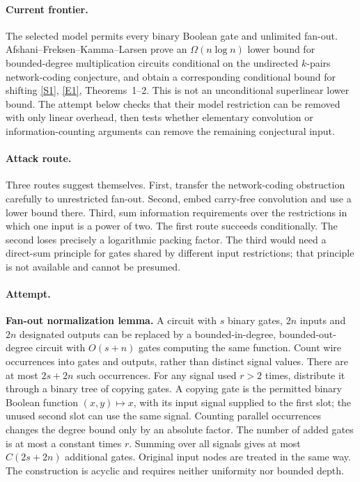 \documentclass[11pt,a4paper]{article}
\newcommand{\sref}[2]{\hyperlink{source:#1:#2}{[S#2]}}
\newcommand{\eref}[2]{\hyperlink{extra:#1:#2}{[E#2]}}
\numberwithin{equation}{section}
\begin{document}
\paragraph{Current frontier.}
The selected model permits every binary Boolean gate and unlimited fan-out. Afshani--Freksen--Kamma--Larsen prove an $\Omega(n\log n)$ lower bound for bounded-degree multiplication circuits conditional on the undirected $k$-pairs network-coding conjecture, and obtain a corresponding conditional bound for shifting \sref{189}{1}, \eref{189}{1}, Theorems~1--2. This is not an unconditional superlinear lower bound. The attempt below checks that their model restriction can be removed with only linear overhead, then tests whether elementary convolution or information-counting arguments can remove the remaining conjectural input.

\paragraph{Attack route.}
Three routes suggest themselves. First, transfer the network-coding obstruction carefully to unrestricted fan-out. Second, embed carry-free convolution and use a lower bound there. Third, sum information requirements over the restrictions in which one input is a power of two. The first route succeeds conditionally. The second loses precisely a logarithmic packing factor. The third would need a direct-sum principle for gates shared by different input restrictions; that principle is not available and cannot be presumed.

\paragraph{Attempt.}
\textbf{Fan-out normalization lemma.} A circuit with $s$ binary gates, $2n$ inputs and $2n$ designated outputs can be replaced by a bounded-in-degree, bounded-out-degree circuit with $O(s+n)$ gates computing the same function.
Count wire occurrences into gates and outputs, rather than distinct signal values. There are at most $2s+2n$ such occurrences. For any signal used $r>2$ times, distribute it through a binary tree of copying gates. A copying gate is the permitted binary Boolean function $(x,y)\mapsto x$, with its input signal supplied to the first slot; the unused second slot can use the same signal. Counting parallel occurrences changes the degree bound only by an absolute factor. The number of added gates is at most a constant times $r$. Summing over all signals gives at most $C(2s+2n)$ additional gates. Original input nodes are treated in the same way. The construction is acyclic and requires neither uniformity nor bounded depth.
\end{document}
